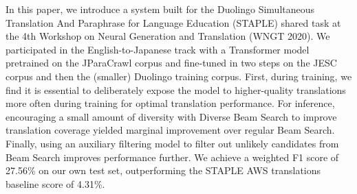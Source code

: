 In this paper, we introduce a system built for the Duolingo Simultaneous Translation And Paraphrase for Language Education (STAPLE) shared task at the 4th Workshop on Neural Generation and Translation (WNGT 2020). We participated in the English-to-Japanese track with a Transformer model pretrained on the JParaCrawl corpus and fine-tuned in two steps on the JESC corpus and then the (smaller) Duolingo training corpus. First, during training, we find it is essential to deliberately expose the model to higher-quality translations more often during training for optimal translation performance. For inference, encouraging a small amount of diversity with Diverse Beam Search to improve translation coverage yielded marginal improvement over regular Beam Search. Finally, using an auxiliary filtering model to filter out unlikely candidates from Beam Search improves performance further. We achieve a weighted F1 score of 27.56\% on our own test set, outperforming the STAPLE AWS translations baseline score of 4.31\%.
